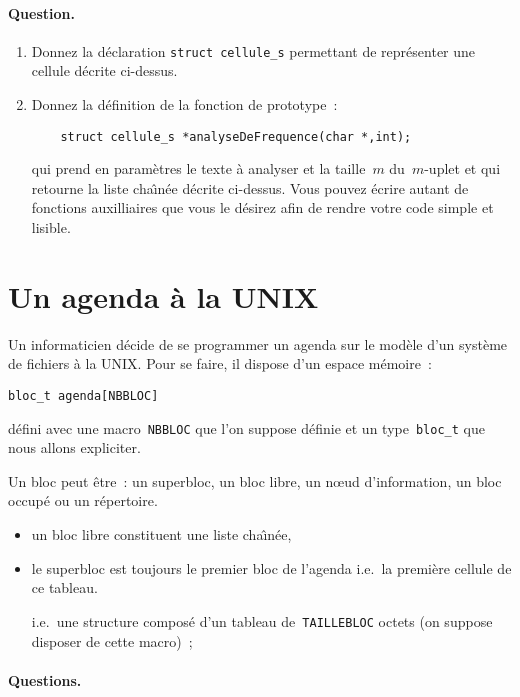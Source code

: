 \paragraph{Question.}
\begin{enumerate}
\item Donnez la d\'eclaration \verb+struct cellule_s+ permettant de
  repr\'esenter une cellule d\'ecrite ci-dessus.
\item Donnez la d\'efinition de la fonction de prototype~:
\begin{verbatim}
    struct cellule_s *analyseDeFrequence(char *,int);
\end{verbatim}
  qui prend en param\`etres le texte \`a analyser et la taille~$m$
  du~$m$-uplet et qui retourne la liste cha\^\i{}n\'ee d\'ecrite
  ci-dessus. Vous pouvez \'ecrire autant de fonctions auxilliaires que
  vous le d\'esirez afin de rendre votre code simple et lisible.
\end{enumerate}

\section{Un agenda \`a la UNIX}
Un informaticien d\'ecide de se programmer un agenda sur le mod\`ele
d'un syst\`eme de fichiers \`a la UNIX. Pour se faire, il dispose d'un
espace m\'emoire~:
\begin{verbatim}
bloc_t agenda[NBBLOC]
\end{verbatim}
d\'efini avec une macro~\verb+NBBLOC+ que l'on suppose d\'efinie et un
type~\verb+bloc_t+ que nous allons expliciter.
\par
Un bloc peut \^etre~: un superbloc, un bloc libre, un n\oe{}ud
d'information, un bloc occup\'e ou un r\'epertoire.
\begin{itemize}
\item un bloc libre constituent une liste cha\^\i{}n\'ee, 
\item le superbloc est toujours le premier bloc de l'agenda i.e.\ la
  premi\`ere cellule de ce tableau.

  i.e.\ une structure compos\'e d'un tableau de~\verb+TAILLEBLOC+
  octets (on suppose disposer de cette macro)~;
\end{itemize}

\paragraph{Questions.}




